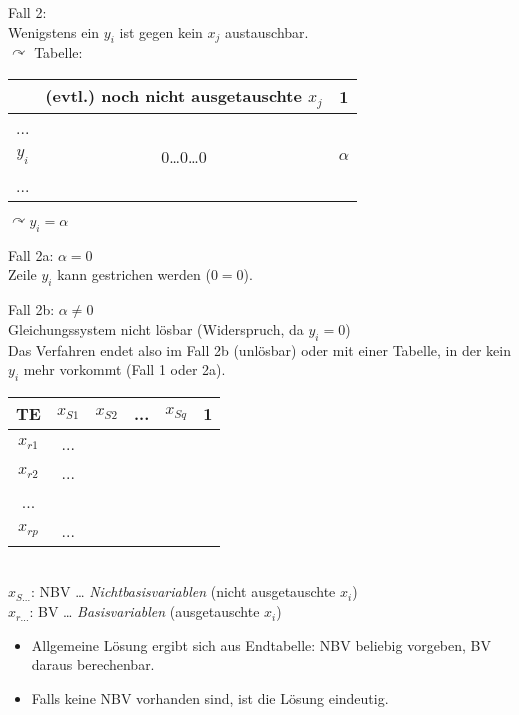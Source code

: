 Fall 2:\\
Wenigstens ein $y_i$ ist gegen kein $x_j$ austauschbar.\\
$\curvearrowright$ Tabelle: \begin{tabular}{c| c c}
& (evtl.) noch nicht ausgetauschte $x_j$ & 1\\
\hline
...&&\\
$y_i$&0…0…0&$\alpha$\\ 
...&&\\
\end{tabular}
$\curvearrowright y_i=\alpha$

Fall 2a:
$\alpha=0$\\
Zeile $y_i$ kann gestrichen werden ($0=0$).

Fall 2b:
$\alpha \not = 0 $\\
Gleichungssystem nicht lösbar (Widerspruch, da $y_i=0$)\medskip\\
Das Verfahren endet also im Fall 2b (unlösbar) oder mit einer Tabelle, in der kein $y_i$ mehr vorkommt (Fall 1 oder 2a).\\
\begin{tabular}{c | c c c c c}
TE & $x_{S1}$ & $x_{S2}$ & ... & $x_{Sq}$ & 1\\
\hline
$x_{r1}$ &...\\
$x_{r2}$ & ...\\
...\\
$x_{rp}$& ...
\end{tabular}\\
$x_{S...}$: NBV … \emph{Nichtbasisvariablen} (nicht ausgetauschte $x_i$)\\
$x_{r...}$: BV … \emph{Basisvariablen} (ausgetauschte $x_i$)
\begin{itemize}
\item Allgemeine Lösung ergibt sich aus Endtabelle: NBV beliebig vorgeben, BV daraus berechenbar.
\item Falls keine NBV vorhanden sind, ist die Lösung eindeutig.
\end{itemize}
